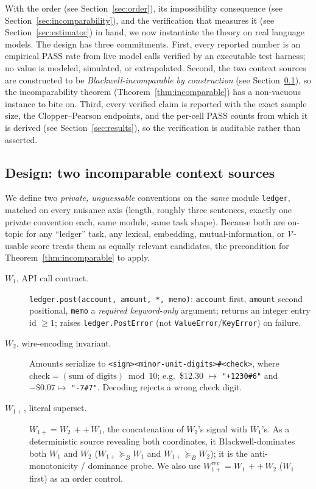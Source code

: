 \documentclass[11pt]{article}
\theoremstyle{plain}
\theoremstyle{definition}
\theoremstyle{remark}
\newcommand{\Vcal}{\mathcal{V}}
\newcommand{\Bord}{\succeq_{B}}
\begin{document}
With the order (see Section~\ref{sec:order}), its impossibility consequence (see Section~\ref{sec:incomparability}),
and the verification that measures it (see Section~\ref{sec:estimator}) in hand, we now instantiate the
theory on real language models. The design has three commitments. First, every reported number is an empirical PASS rate from live model
calls verified by an executable test harness; no value is modeled, simulated, or extrapolated.
Second, the two context sources are constructed to be \emph{Blackwell-incomparable by construction}
(see Section~\ref{sec:design}), so the incomparability theorem (Theorem~\ref{thm:incomparable}) has a
non-vacuous instance to bite on. Third, every verified claim is reported with the exact sample
size, the Clopper--Pearson endpoints, and the per-cell PASS counts from which it is derived
(see Section~\ref{sec:results}), so the verification is auditable rather than asserted.

\subsection{Design: two incomparable context sources}
\label{sec:design}

We define two \emph{private, unguessable} conventions on the \emph{same} module \texttt{ledger},
matched on every nuisance axis (length, roughly three sentences, exactly one private convention
each, same module, same task shape). Because both are on-topic for any ``ledger'' task, any lexical,
embedding, mutual-information, or $\Vcal$-usable score treats them as equally relevant
candidates, the precondition for Theorem~\ref{thm:incomparable} to apply.

\begin{description}
  \item[$W_1$, API call contract.] \texttt{ledger.post(account, amount, *, memo)}: \texttt{account}
  first, \texttt{amount} second positional, \texttt{memo} a \emph{required keyword-only} argument;
  returns an integer entry id $\ge 1$; raises \texttt{ledger.PostError} (not
  \texttt{ValueError}/\texttt{KeyError}) on failure.
  \item[$W_2$, wire-encoding invariant.] Amounts serialize to \texttt{<sign><minor-unit-digits>\#<check>},
  where $\mathrm{check} = (\text{sum of digits}) \bmod 10$; e.g.\ \$12.30 $\mapsto$ \texttt{"+1230\#6"}
  and $-\$0.07 \mapsto$ \texttt{"-7\#7"}. Decoding rejects a wrong check digit.
  \item[$W_{1+}$, literal superset.] $W_{1+} = W_2 \,{+}{+}\, W_1$, the concatenation of
  $W_2$'s signal with $W_1$'s. As a deterministic source revealing both coordinates, it
  Blackwell-dominates both $W_1$ and $W_2$ ($W_{1+} \Bord W_1$ and $W_{1+} \Bord W_2$);
  it is the anti-monotonicity / dominance probe. We also use
  $W_{1+}^{\mathrm{rev}} = W_1 \,{+}{+}\, W_2$ ($W_1$ first) as an order control.
\end{description}
\end{document}
